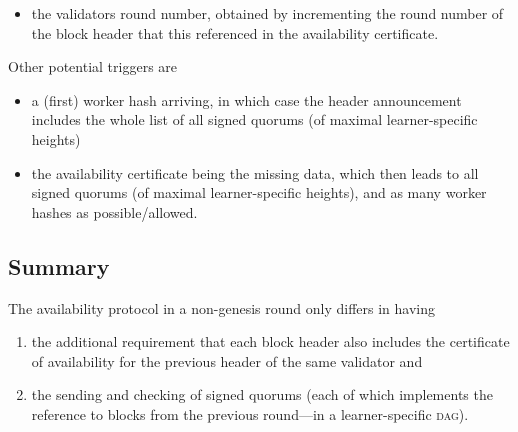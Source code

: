 \documentclass[dvipsnames]{article}
\theoremstyle{definition}
\newcommand{\xnote}[1]{
  \marginnote{\footnotesize #1}%
}
\newcommand{\Dag}[1][]{\textsc{dag}#1\xspace}
\newcommand{\ie}[1][, ]{\emph{i.e.}#1}
\begin{document}
\begin{description}
\begin{description}
\begin{itemize}
    \item the validators round number, obtained by incrementing the round number
      of the block header that this referenced in the availability certificate. 
    \end{itemize}
    Other potential triggers are
    \begin{itemize}
    \item a (first) worker hash arriving,
      in which case the header announcement includes the whole list of all
      signed quorums (of maximal learner-specific heights)
    \item the availability certificate being the missing data,
      which then leads to all
      signed quorums (of maximal learner-specific heights),
      and as many worker hashes as possible/allowed. 
    \end{itemize}
  \end{description}


\end{description}



\subsection{Summary}
The availability protocol in a non-genesis round
only differs in having
\begin{enumerate}
\item the additional requirement
that each block header also includes
the certificate of availability
for the previous header of the same validator and
\item
the sending and checking of signed quorums
(each of which implements the reference to
blocks from the previous round—in a learner-specific \Dag).
\end{enumerate}
\end{document}
